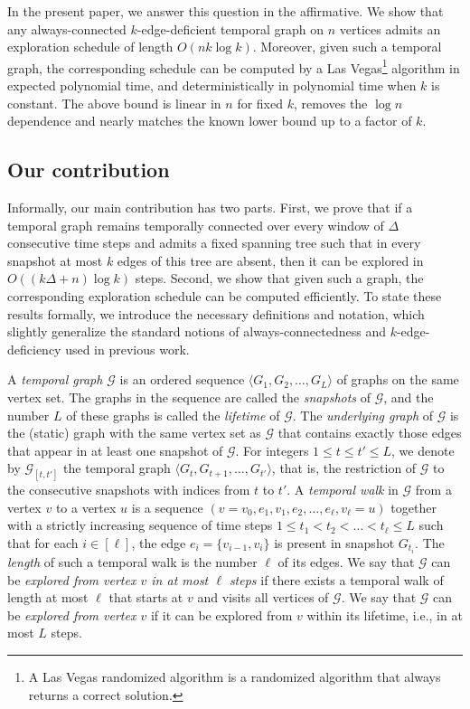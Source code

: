 \documentclass[a4paper,11pt]{article}
\theoremstyle{definition}
\theoremstyle{remark}
\newcommand{\cG}{\ensuremath{\mathcal{G}}}
\begin{document}
	In the present paper, we answer this question in the affirmative. We show that any always-connected $k$-edge-deficient temporal graph on $n$ vertices admits an exploration schedule of length $O(n k \log k)$. Moreover, given such a temporal graph, the corresponding schedule can be computed by a Las Vegas\footnote{A
    Las Vegas randomized algorithm is a randomized algorithm that always returns a correct solution.} algorithm in expected polynomial time, and deterministically in polynomial time when $k$ is constant. The above bound is linear in $n$ for fixed $k$, removes the $\log n$ dependence 
    and nearly matches the known lower bound up to a factor of $k$. 


	\subsection{Our contribution}
    
    Informally, our main contribution has two parts. First, we prove that if a temporal graph remains temporally connected over every window of $\Delta$ consecutive time steps and admits a fixed spanning tree such that in every snapshot at most $k$ edges of this tree are absent, then it can be explored in $O((k\Delta + n)\log k)$ steps. 
    Second, we show that given such a graph, the corresponding exploration schedule can be computed efficiently.
    To state these results formally, we introduce the necessary definitions and notation,
    which slightly generalize the standard notions of always-connectedness and
    $k$-edge-deficiency used in previous work.
    
    A \emph{temporal graph $\cG$} is an ordered sequence
    $\langle G_1,G_2,\dots,G_L\rangle$ of graphs on the same vertex set.
    The graphs in the sequence are called the \emph{snapshots} of $\cG$, and the number
    $L$ of these graphs is called the \emph{lifetime} of $\cG$.
    The \emph{underlying graph} of $\cG$ is the (static) graph with the same vertex set
    as $\cG$ that contains exactly those edges that appear in at least one snapshot of
    $\cG$.
    For integers $1 \le t \le t' \le L$, we denote by $\cG_{[t,t']}$ the temporal graph
    $\langle G_t, G_{t+1}, \dots, G_{t'} \rangle$, that is, the restriction of $\cG$ to
    the consecutive snapshots with indices from $t$ to $t'$.
    A \emph{temporal walk} in $\cG$ from a vertex $v$ to a vertex $u$ is a sequence
    $(v = v_0, e_1, v_1, e_2, \dots, e_\ell, v_\ell = u)$ together with a strictly
    increasing sequence of time steps
    $1 \le t_1 < t_2 < \dots < t_\ell \le L$
    such that for each $i \in [\ell]$, the edge
    $e_i = \{v_{i-1}, v_i\}$ is present in snapshot $G_{t_i}$.
    The \emph{length} of such a temporal walk is the number $\ell$ of its edges.
    We say that $\cG$ can be \emph{explored from vertex $v$ in at most $\ell$ steps} if there exists a temporal walk of length at most $\ell$ that starts at $v$ and visits
    all vertices of $\cG$.
    We say that $\cG$ can be \emph{explored from vertex $v$} if it can be explored from $v$ within its lifetime, i.e., in at most $L$ steps.
    
\end{document}

